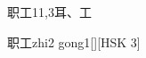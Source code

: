 \begin{entry}{职工}{11,3}{⽿、⼯}
  \begin{phonetics}{职工}{zhi2 gong1}[][HSK 3]
  \end{phonetics}
\end{entry}
